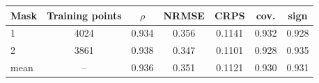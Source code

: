 \begin{tabular}{lcccccc}
\toprule
Mask & Training points & $\rho$ & NRMSE & CRPS & cov. & sign\\
\midrule
1 & 4024 & 0.934 & 0.356 & 0.1141 & 0.932 & 0.928\\
2 & 3861 & 0.938 & 0.347 & 0.1101 & 0.928 & 0.935\\
\midrule
mean & -- & 0.936 & 0.351 & 0.1121 & 0.930 & 0.931\\
\bottomrule
\end{tabular}
